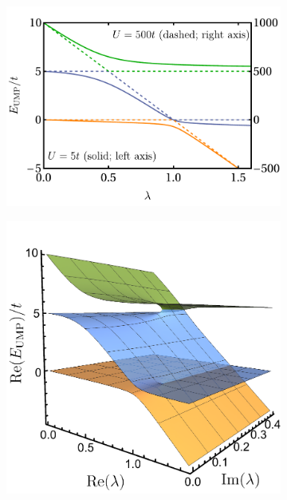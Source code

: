 \documentclass[aps,prb,reprint,noshowkeys,superscriptaddress]{revtex4-1}
\begin{document}
\begin{figure}[t]
	\begin{subfigure}{0.32\textwidth}
    \includegraphics[height=0.75\textwidth,trim={0pt 5pt -10pt 15pt},clip]{fig8a}
		\subcaption{\label{subfig:ump_cp}}
    \end{subfigure}
    \begin{subfigure}{0.32\textwidth}
	\includegraphics[height=0.75\textwidth]{fig8b}
		\subcaption{\label{subfig:ump_cp_surf}}
    \end{subfigure}
    \begin{subfigure}{0.32\textwidth}

\end{subfigure}
\end{figure}
\end{document}
